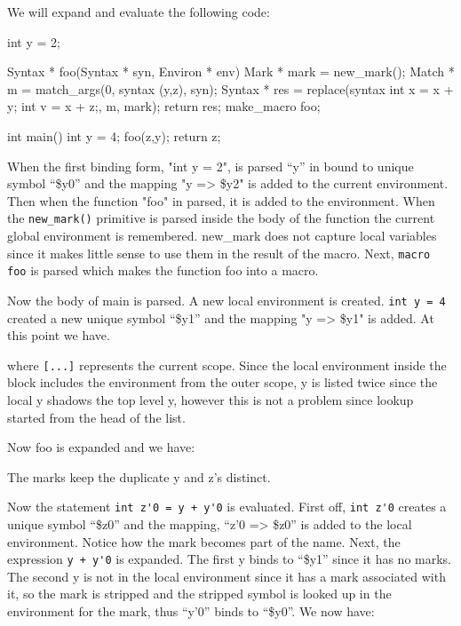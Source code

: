 \documentclass[12pt,english,letterpaper]{article}
\begin{document}
We will expand and evaluate the following code:

\begin{code}
int y = 2;

Syntax * foo(Syntax * syn, Environ * env) {
  Mark * mark = new_mark();
  Match * m = match_args(0, syntax (y,z), syn);
  Syntax * res = replace(syntax {int x = x + y;
                                 int v = x + z;}, m, mark);
  return res;
}
make_macro foo;

int main() {
  int y = 4;
  foo(z,y);
  return z;
}
\end{code}

When the first binding form, "int y = 2", is parsed ``y'' in bound to
unique symbol ``\$y0'' and the mapping "y => \$y2" is added to the
current environment.  Then when the function "foo" in parsed, it is
added to the environment.  When the \verb/new_mark()/ primitive is
parsed inside the body of the function the current global environment
is remembered.  new\_mark does not capture local variables since it
makes little sense to use them in the result of the macro.  Next,
\verb/macro foo/ is parsed which makes the function foo into a macro.

Now the body of main is parsed.  A new local environment is created.
\verb/int y = 4/ created a new unique symbol ``\$y1'' and the mapping
"y => \$y1" is added.  At this point we have.


where \verb/[...]/ represents the current scope.  Since the local
environment inside the block includes the environment from the outer
scope, y is listed twice since the local y shadows the top level y,
however this is not a problem since lookup started from the head of
the list.

Now foo is expanded and we have:


The marks keep the duplicate y and z's distinct.

Now the statement \verb/int z'0 = y + y'0/ is evaluated.  First off,
\verb/int z'0/ creates a unique symbol ``\$z0'' and the mapping, ``z'0
=> \$z0'' is added to the local environment.  Notice how the mark
becomes part of the name.  Next, the expression \verb/y + y'0/ is
expanded.  The first y binds to ``\$y1'' since it has no marks.  The
second y is not in the local environment since it has a mark
associated with it, so the mark is stripped and the stripped symbol is
looked up in the environment for the mark, thus ``y'0'' binds to
``\$y0''.  We now have:
\end{document}
